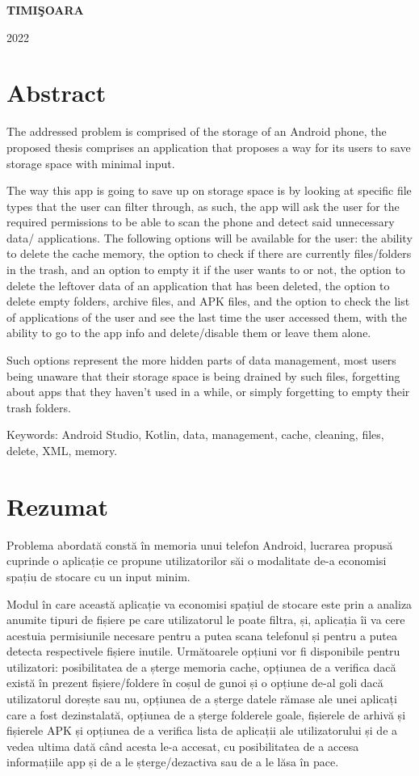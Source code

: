 \documentclass[12pt,a4paper,openany]{book}
\theoremstyle{definition}
\theoremstyle{remark}
\begin{document}
\vfill
\begin{center}
{\bf TIMI\c SOARA

2022}
\end{center}

\newpage
\normalsize{}

\section*{Abstract} 
The addressed problem is comprised of the storage of an Android phone, the proposed thesis comprises an application that proposes a way for its users to save storage space with minimal input. 

The way this app is going to save up on storage space is by looking at specific file types that the user can filter through, as such, the app will ask the user for the required permissions to be able to scan the phone and detect said unnecessary data/ applications. The following options will be available for the user: the ability to delete the cache memory, the option to check if there are currently files/folders in the trash, and an option to empty it if the user wants to or not, the option to delete the leftover data of an application that has been deleted, the option to delete empty folders, archive files, and \ac{APK} files, and the option to check the list of applications of the user and see the last time the user accessed them, with the ability to go to the \ac{app} info and delete/disable them or leave them alone.

Such options represent the more hidden parts of data management, most users being unaware that their storage space is being drained by such files, forgetting about apps that they haven't used in a while, or simply forgetting to empty their trash folders.

Keywords: Android Studio, Kotlin, data, management, cache, cleaning, files, delete, XML, memory.
\newpage
\normalsize{}

\section*{Rezumat} 
Problema abordată constă în memoria unui telefon Android, lucrarea propusă cuprinde o aplicație ce propune utilizatorilor săi o modalitate de-a economisi spațiu de stocare cu un input minim.

Modul în care această aplicație va economisi spațiul de stocare este prin a analiza anumite tipuri de fișiere pe care utilizatorul le poate filtra, și, aplicația îi va cere acestuia permisiunile necesare pentru a putea scana telefonul și pentru a putea detecta respectivele fișiere inutile. Următoarele opțiuni vor fi disponibile pentru utilizatori: posibilitatea de a șterge memoria cache, opțiunea de a verifica dacă există în prezent fișiere/foldere în coșul de gunoi și o opțiune de-al goli dacă utilizatorul dorește sau nu, opțiunea de a șterge datele rămase ale unei aplicați care a fost dezinstalată, opțiunea de a șterge folderele goale, fișierele de arhivă și fișierele \ac{APK} și opțiunea de a verifica lista de aplicații ale utilizatorului și de a vedea ultima dată când acesta le-a accesat, cu posibilitatea de a accesa informațiile \ac{app} și de a le șterge/dezactiva sau de a le lăsa în pace.
\end{document}
